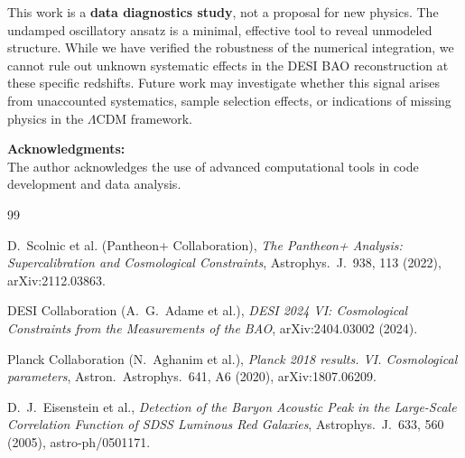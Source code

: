 \documentclass[10pt,a4paper,twocolumn]{article}
\begin{document}
This work is a \textbf{data diagnostics study}, not a proposal for new physics.
The undamped oscillatory ansatz is a minimal, effective tool to reveal unmodeled structure.
While we have verified the robustness of the numerical integration,
we cannot rule out unknown systematic effects in the DESI BAO reconstruction at these specific redshifts.
Future work may investigate whether this signal arises from unaccounted systematics,
sample selection effects, or indications of missing physics in the $\Lambda$CDM framework.

\vspace{1em}
\textbf{Acknowledgments:}\\
The author acknowledges the use of advanced computational tools in code development and data analysis.


\begin{thebibliography}{99}

D.~Scolnic et al. (Pantheon+ Collaboration),
\emph{The Pantheon+ Analysis: Supercalibration and Cosmological Constraints},
Astrophys.~J.~938, 113 (2022), arXiv:2112.03863.

DESI Collaboration (A.~G.~Adame et al.),
\emph{DESI 2024 VI: Cosmological Constraints from the Measurements of the BAO},
arXiv:2404.03002 (2024).

Planck Collaboration (N.~Aghanim et al.),
\emph{Planck 2018 results. VI. Cosmological parameters},
Astron.~Astrophys.~641, A6 (2020), arXiv:1807.06209.

D.~J.~Eisenstein et al.,
\emph{Detection of the Baryon Acoustic Peak in the Large-Scale Correlation Function of SDSS Luminous Red Galaxies},
Astrophys.~J.~633, 560 (2005), astro-ph/0501171.

\end{thebibliography}
\end{document}

